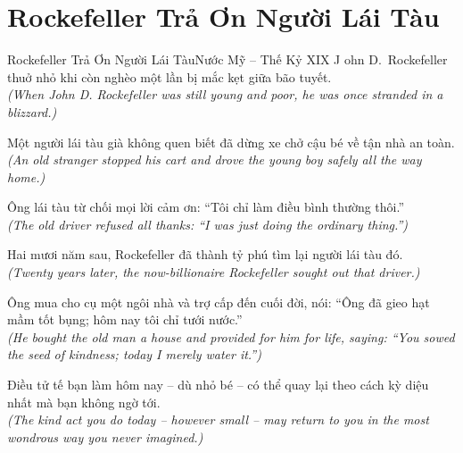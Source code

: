 \section{Rockefeller Trả Ơn Người Lái Tàu}
\begin{truyen}{Rockefeller Trả Ơn Người Lái Tàu}{Nước Mỹ -- Thế Kỷ XIX}
J ohn D.\ Rockefeller thuở nhỏ khi còn nghèo một lần bị mắc kẹt giữa bão tuyết.\\
\textit{(When John D. Rockefeller was still young and poor, he was once stranded in a blizzard.)}

Một người lái tàu già không quen biết đã dừng xe chở cậu bé về tận nhà an toàn.\\
\textit{(An old stranger stopped his cart and drove the young boy safely all the way home.)}

Ông lái tàu từ chối mọi lời cảm ơn: ``Tôi chỉ làm điều bình thường thôi.''\\
\textit{(The old driver refused all thanks: ``I was just doing the ordinary thing.'')}

Hai mươi năm sau, Rockefeller đã thành tỷ phú tìm lại người lái tàu đó.\\
\textit{(Twenty years later, the now-billionaire Rockefeller sought out that driver.)}

Ông mua cho cụ một ngôi nhà và trợ cấp đến cuối đời, nói: ``Ông đã gieo hạt mầm tốt bụng; hôm nay tôi chỉ tưới nước.''\\
\textit{(He bought the old man a house and provided for him for life, saying: ``You sowed the seed of kindness; today I merely water it.'')}

\end{truyen}
\begin{baihoc}
  Điều tử tế bạn làm hôm nay -- dù nhỏ bé -- có thể quay lại theo cách kỳ diệu nhất mà bạn không ngờ tới.\\
  \textit{(The kind act you do today -- however small -- may return to you in the most wondrous way you never imagined.)}
\end{baihoc}

